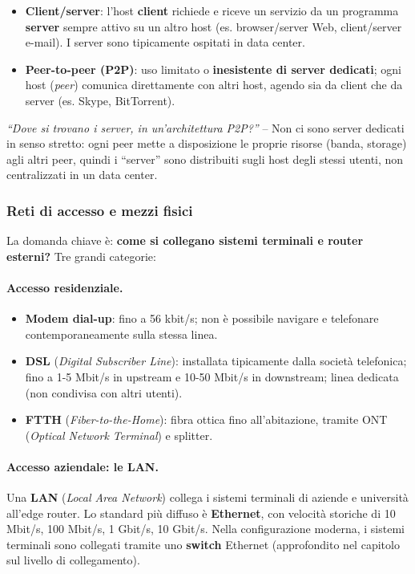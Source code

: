 \documentclass[12pt, a4paper]{article}
\begin{document}
\begin{itemize}
    \item \textbf{Client/server}: l'host \textbf{client} richiede e riceve un servizio da un programma \textbf{server} sempre attivo su un altro host (es. browser/server Web, client/server e-mail). I server sono tipicamente ospitati in data center.
    \item \textbf{Peer-to-peer (P2P)}: uso limitato o \textbf{inesistente di server dedicati}; ogni host (\textit{peer}) comunica direttamente con altri host, agendo sia da client che da server (es. Skype, BitTorrent).
\end{itemize}

\begin{tcolorbox}[colback=cyan!5, colframe=blue!40!black, title=\textbf{Possibile domanda orale}]
\textit{``Dove si trovano i server, in un'architettura P2P?''} -- Non ci sono server dedicati in senso stretto: ogni peer mette a disposizione le proprie risorse (banda, storage) agli altri peer, quindi i ``server'' sono distribuiti sugli host degli stessi utenti, non centralizzati in un data center.
\end{tcolorbox}

\subsubsection{Reti di accesso e mezzi fisici}

La domanda chiave è: \textbf{come si collegano sistemi terminali e router esterni?} Tre grandi categorie:

\paragraph{Accesso residenziale.}
\begin{itemize}
    \item \textbf{Modem dial-up}: fino a 56 kbit/s; non è possibile navigare e telefonare contemporaneamente sulla stessa linea.
    \item \textbf{DSL} (\textit{Digital Subscriber Line}): installata tipicamente dalla società telefonica; fino a 1-5 Mbit/s in upstream e 10-50 Mbit/s in downstream; linea dedicata (non condivisa con altri utenti).
    \item \textbf{FTTH} (\textit{Fiber-to-the-Home}): fibra ottica fino all'abitazione, tramite ONT (\textit{Optical Network Terminal}) e splitter.
\end{itemize}

\paragraph{Accesso aziendale: le LAN.}
Una \textbf{LAN} (\textit{Local Area Network}) collega i sistemi terminali di aziende e università all'edge router. Lo standard più diffuso è \textbf{Ethernet}, con velocità storiche di 10 Mbit/s, 100 Mbit/s, 1 Gbit/s, 10 Gbit/s. Nella configurazione moderna, i sistemi terminali sono collegati tramite uno \textbf{switch} Ethernet (approfondito nel capitolo sul livello di collegamento).
\end{document}
